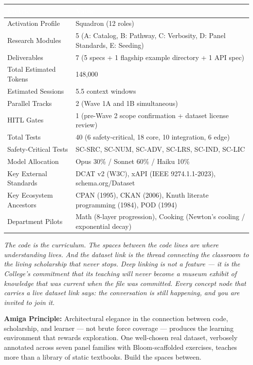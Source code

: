 \documentclass[11pt,letterpaper]{article}
\newcommand{\tableheader}[1]{\textbf{\sffamily\textcolor{white}{#1}}}
\begin{document}
\begin{center}
\begin{tabularx}{\textwidth}{L{5cm}X}
\toprule
{}
\tableheader{Metric} & \tableheader{Value} \\
\midrule
Activation Profile & Squadron (12 roles) \\
Research Modules & 5 (A: Catalog, B: Pathway, C: Verbosity, D: Panel Standards, E: Seeding) \\
Deliverables & 7 (5 specs + 1 flagship example directory + 1 API spec) \\
Total Estimated Tokens & 148,000 \\
Estimated Sessions & 5.5 context windows \\
Parallel Tracks & 2 (Wave 1A and 1B simultaneous) \\
HITL Gates & 1 (pre-Wave 2 scope confirmation + dataset license review) \\
Total Tests & 40 (6 safety-critical, 18 core, 10 integration, 6 edge) \\
Safety-Critical Tests & SC-SRC, SC-NUM, SC-ADV, SC-LRS, SC-IND, SC-LIC \\
Model Allocation & Opus 30\% / Sonnet 60\% / Haiku 10\% \\
Key External Standards & DCAT v2 (W3C), xAPI (IEEE 9274.1.1-2023), schema.org/Dataset \\
Key Ecosystem Ancestors & CPAN (1995), CKAN (2006), Knuth literate programming (1984), POD (1994) \\
Department Pilots & Math (8-layer progression), Cooking (Newton's cooling / exponential decay) \\
\bottomrule
\end{tabularx}
\end{center}

\vspace{2em}
\begin{quotebox}
\itshape
The code is the curriculum. The spaces between the code lines are where understanding lives. And the dataset link is the thread connecting the classroom to the living scholarship that never stops. Deep linking is not a feature --- it is the College's commitment that its teaching will never become a museum exhibit of knowledge that was current when the file was committed. Every concept node that carries a live dataset link says: \textit{the conversation is still happening, and you are invited to join it.}

\vspace{0.8em}
\upshape
\textbf{Amiga Principle:} Architectural elegance in the connection between code, scholarship, and learner --- not brute force coverage --- produces the learning environment that rewards exploration. One well-chosen real dataset, verbosely annotated across seven panel families with Bloom-scaffolded exercises, teaches more than a library of static textbooks. Build the spaces between.
\end{quotebox}
\end{document}

